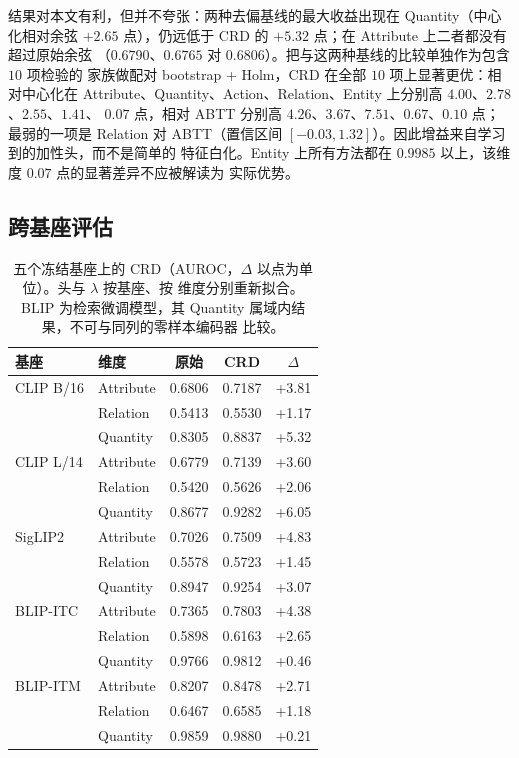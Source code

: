 \documentclass[10pt,twocolumn,a4paper]{ctexart}
\begin{document}
结果对本文有利，但并不夸张：两种去偏基线的最大收益出现在 Quantity（中心化相对余弦
$+2.65$ 点），仍远低于 CRD 的 $+5.32$ 点；在 Attribute 上二者都没有超过原始余弦
（$0.6790$、$0.6765$ 对 $0.6806$）。把与这两种基线的比较单独作为包含 $10$ 项检验的
家族做配对 bootstrap + Holm，CRD 在全部 $10$ 项上显著更优：相对中心化在
Attribute、Quantity、Action、Relation、Entity 上分别高 $4.00$、$2.78$、$2.55$、$1.41$、
$0.07$ 点，相对 ABTT 分别高 $4.26$、$3.67$、$7.51$、$0.67$、$0.10$ 点；最弱的一项是
Relation 对 ABTT（置信区间 $[-0.03,1.32]$）。因此增益来自学习到的加性头，而不是简单的
特征白化。Entity 上所有方法都在 $0.9985$ 以上，该维度 $0.07$ 点的显著差异不应被解读为
实际优势。

\subsection{跨基座评估}
\label{sec:cross-cn}
\begin{table}[t]
\centering
\small
\setlength{\tabcolsep}{3.5pt}
\caption{五个冻结基座上的 CRD（AUROC，$\Delta$ 以点为单位）。头与 $\lambda$ 按基座、按
维度分别重新拟合。BLIP 为检索微调模型，其 Quantity 属域内结果，不可与同列的零样本编码器
比较。}
\label{tab:cross-cn}
\begin{tabular}{llccc}
\toprule
基座 & 维度 & 原始 & CRD & $\Delta$ \\
\midrule
CLIP B/16 & Attribute & 0.6806 & 0.7187 & +3.81 \\
 & Relation & 0.5413 & 0.5530 & +1.17 \\
 & Quantity & 0.8305 & 0.8837 & +5.32 \\
CLIP L/14 & Attribute & 0.6779 & 0.7139 & +3.60 \\
 & Relation & 0.5420 & 0.5626 & +2.06 \\
 & Quantity & 0.8677 & 0.9282 & +6.05 \\
SigLIP2 & Attribute & 0.7026 & 0.7509 & +4.83 \\
 & Relation & 0.5578 & 0.5723 & +1.45 \\
 & Quantity & 0.8947 & 0.9254 & +3.07 \\
BLIP-ITC & Attribute & 0.7365 & 0.7803 & +4.38 \\
 & Relation & 0.5898 & 0.6163 & +2.65 \\
 & Quantity & 0.9766 & 0.9812 & +0.46 \\
BLIP-ITM & Attribute & 0.8207 & 0.8478 & +2.71 \\
 & Relation & 0.6467 & 0.6585 & +1.18 \\
 & Quantity & 0.9859 & 0.9880 & +0.21 \\
\bottomrule
\end{tabular}
\end{table}
\end{document}
